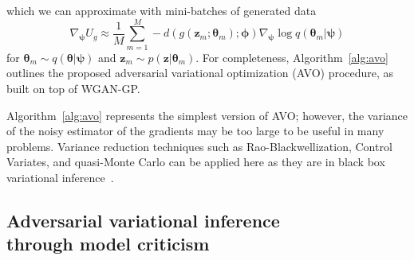 \documentclass[twocolumn,superscriptaddress,aps]{revtex4-1}
\newcommand{\qxpsi}{q(\mathbf{x}|\bfpsi)}
\newcommand{\bftheta}{{\bm \theta}}
\newcommand{\bfpsi}{{\bm \psi}}
\newcommand{\bfphi}{{\bm \phi}}
\newcommand{\bfz}{\mathbf{z}}
\theoremstyle{plain}
\begin{document}
which we can approximate with mini-batches of
generated data
\begin{equation}
    \nabla_\bfpsi U_g \approx \frac{1}{M} \sum_{m=1}^M -d(g(\bfz_m; \bftheta_m); \bfphi) \nabla_\bfpsi \log q(\bftheta_m|\bfpsi)
\end{equation}
for $\bftheta_m \sim q(\bftheta|\bfpsi)$ and $\bfz_m \sim p(\bfz|\bftheta_m)$.
For completeness, Algorithm~\ref{alg:avo} outlines the proposed adversarial variational
optimization (AVO) procedure, as built on top of WGAN-GP.
%


Algorithm~\ref{alg:avo} represents the simplest version of AVO; however, the
variance of the noisy estimator of the gradients may be too large to be useful
in many problems. Variance reduction techniques such as Rao-Blackwellization,
Control Variates, and quasi-Monte Carlo can be applied here as they are in black
box variational inference~\citep{ranganath2014black}.

\subsection{Adversarial variational inference\\
            through model criticism}
\end{document}

